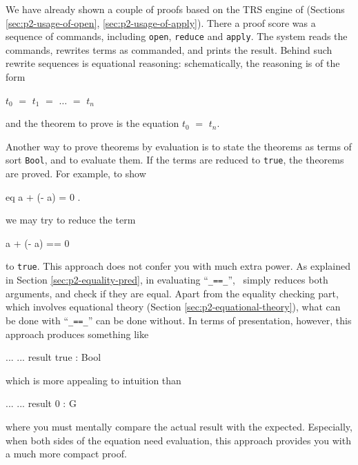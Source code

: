 \documentclass[a4paper]{memoir}
\begin{document}
We have already shown a couple of proofs based on the TRS engine of
\cafeobj(Sections \ref{sec:p2-usage-of-open}, \ref{sec:p2-usage-of-apply}).
There a proof score was a sequence of commands, including
\verb|open|, \verb|reduce| and \verb|apply|. The system reads the commands,
rewrites terms as commanded, and prints the result. Behind such
rewrite sequences is equational reasoning: schematically, the reasoning
is of the form
\begin{center}
  $t_0$ $=$ $t_1$ $=$ $\ldots$ $=$ $t_n$
\end{center}
and the theorem to prove is the equation $t_0$ $=$ $t_n$.

Another way to prove theorems by evaluation is to state the theorems
as terms of sort \verb|Bool|, and to evaluate them. If the terms are
reduced to \verb|true|, the theorems are proved. For example, to
show
\begin{vvtm}
\begin{ccode}
  eq a + (- a) = 0 .
\end{ccode}
\end{vvtm}
we may try to reduce the term
\begin{vvtm}
\begin{ccode}
  a + (- a) == 0
\end{ccode}
\end{vvtm}
to \verb|true|. This approach does not confer
you with much extra power. As explained in Section
\ref{sec:p2-equality-pred}, in evaluating ``\verb|_==_|'',
\cafeobj~simply reduces both arguments, and check if they are equal.
Apart from the equality checking part, which involves
equational theory (Section \ref{sec:p2-equational-theory}),
what can be done with ``\verb|_==_|'' can be done without.
In terms of presentation, however, this approach produces
something like
\begin{vvtm}
\begin{ccode}
  ...
  ...
  result true : Bool
\end{ccode}
\end{vvtm}
which is more appealing to intuition than
\begin{vvtm}
\begin{ccode}
  ...
  ...
  result 0 : G
\end{ccode}
\end{vvtm}
where you must mentally compare the actual result with the expected.
Especially, when both sides of the equation need evaluation, this
approach provides you with a much more compact proof.
\end{document}
